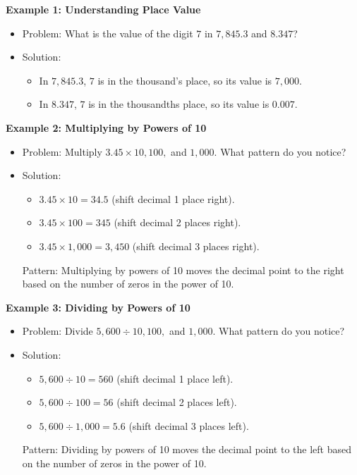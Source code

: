 \documentclass[12pt]{article}
\begin{document}
\begin{tcolorbox}[colframe=black!60, colback=white, 
coltitle=black, colbacktitle=black!15, fonttitle=\bfseries\Large, 
title=Examples, halign title=center, left=10pt, right=10pt, top=10pt, bottom=15pt]
\textbf{Example 1: Understanding Place Value}
\begin{itemize}
    \item Problem: What is the value of the digit \( 7 \) in \( 7,845.3 \) and \( 8.347 \)?
    \item Solution:
    \begin{itemize}
        \item In \( 7,845.3 \), \( 7 \) is in the thousand’s place, so its value is \( 7,000 \).
        \item In \( 8.347 \), \( 7 \) is in the thousandths place, so its value is \( 0.007 \).
    \end{itemize}
\end{itemize}

\textbf{Example 2: Multiplying by Powers of 10}
\begin{itemize}
    \item Problem: Multiply \( 3.45 \times 10, 100, \) and \( 1,000 \). What pattern do you notice?
    \item Solution:
    \begin{itemize}
        \item \( 3.45 \times 10 = 34.5 \) (shift decimal 1 place right).
        \item \( 3.45 \times 100 = 345 \) (shift decimal 2 places right).
        \item \( 3.45 \times 1,000 = 3,450 \) (shift decimal 3 places right).
    \end{itemize}
    Pattern: Multiplying by powers of 10 moves the decimal point to the right based on the number of zeros in the power of 10.
\end{itemize}

\textbf{Example 3: Dividing by Powers of 10}
\begin{itemize}
    \item Problem: Divide \( 5,600 \div 10, 100, \) and \( 1,000 \). What pattern do you notice?
    \item Solution:
    \begin{itemize}
        \item \( 5,600 \div 10 = 560 \) (shift decimal 1 place left).
        \item \( 5,600 \div 100 = 56 \) (shift decimal 2 places left).
        \item \( 5,600 \div 1,000 = 5.6 \) (shift decimal 3 places left).
    \end{itemize}
    Pattern: Dividing by powers of 10 moves the decimal point to the left based on the number of zeros in the power of 10.
\end{itemize}


\end{tcolorbox}
\end{document}

